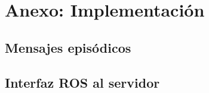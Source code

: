 \chapter{Anexo: Implementación}\label{chapter:appendix_b}

\section{Mensajes episódicos}

\lstset{style=/Style/ROS/MSG}










\section{Interfaz ROS al servidor}

\lstset{style=/Style/ROS/MSG}



